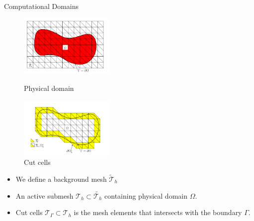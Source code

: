 \begin{frame}{Computational Domains}
    \begin{block}{}
        \begin{figure}
            \centering
            \parbox{5cm}{
                \includegraphics[width=4.5cm]{figures/physical_domain.png}
                \caption{Physical domain}
            \label{fig:2figsA}}
            \qquad
            \begin{minipage}{5cm}
                \includegraphics[width=4.5cm]{figures/minimal_subset.png}
                \caption{Cut cells}
                \label{fig:2figsB}
            \end{minipage}
        \end{figure}
        \begin{itemize}
            \item We define a background mesh $\widetilde{\mathcal{T} }_{h}$
            \item An active submesh $\mathcal{T} _{h} \subset \widetilde{\mathcal{T} _{h}}$ containing physical domain $\Omega $.
            \item Cut cells $ \mathcal{T} _{\Gamma} \subset \mathcal{T} _{h} $ is the mesh elements that intersects with the boundary $\Gamma  $.
        \end{itemize}
    \end{block}
\end{frame}

